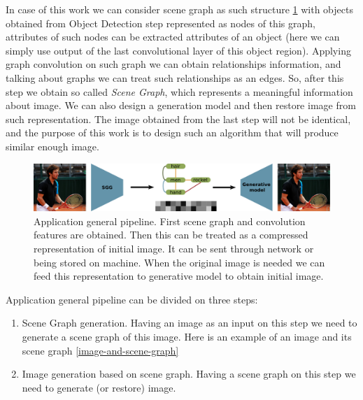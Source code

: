 In case of this work we can consider scene graph as such structure \ref{application-general-pipeline} with objects obtained from Object Detection step represented as nodes of this graph, attributes of such nodes can be extracted attributes of an object (here we can simply use output of the last convolutional layer of this object region). Applying graph convolution on such graph we can obtain relationships information, and talking about graphs we can treat such relationships as an edges. So, after this step we obtain so called \textit{Scene Graph}, which represents a meaningful information about image. We can also design a generation model and then restore image from such representation. The image obtained from the last step will not be identical, and the purpose of this work is to design such an algorithm that will produce similar enough image.

\begin{figure}
    \centering
    \includegraphics[width=\textwidth]{figure/application-general-pipeline.png}
    \caption{Application general pipeline. First scene graph and convolution features are obtained. Then this can be treated as a compressed representation of initial image. It can be sent through network or being stored on machine. When the original image is needed we can feed this representation to generative model to obtain initial image.}
    \label{application-general-pipeline}
\end{figure}

Application general pipeline can be divided on three steps:

\begin{enumerate}
    \item Scene Graph generation. Having an image as an input on this step we need to generate a scene graph of this image. Here is an example of an image and its scene graph \ref{image-and-scene-graph}
    \item Image generation based on scene graph. Having a scene graph on this step we need to generate (or restore) image.
\end{enumerate}

